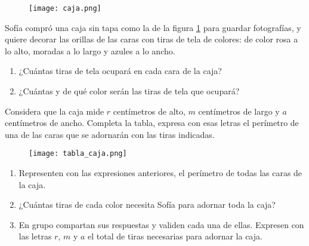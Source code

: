 \begin{enumerate}
    \begin{minipage}[t]{.2\textwidth}
        \begin{figure}[H]
            \centering
            \texttt{[image: caja.png]}
            \label{fig:caja}
        \end{figure}
    \end{minipage}\hfill
    \begin{minipage}[t]{.7\textwidth}
        \item Sofía compró una caja sin tapa como la de la figura \ref{fig:caja} para guardar fotografías,
        y quiere decorar las orillas de las caras con tiras de tela de colores: de color rosa
        a lo alto, moradas a lo largo y azules a lo ancho.

        \begin{enumerate}
            \item ¿Cuántas tiras de tela ocupará en cada cara de la caja?
            \item ¿Cuántas y de qué color serán las tiras de tela que ocupará?
        \end{enumerate}
    \end{minipage}

    \item Considera que la caja mide $r$ centímetros de alto, $m$ centímetros de largo
          y $a$ centímetros de ancho. Completa la tabla, expresa con esas letras el perímetro
          de una de las caras que se adornarán con las tiras indicadas.
          \begin{figure}[H]
              \centering
              \texttt{[image: tabla\_caja.png]}
              \label{fig:tabla_caja}
          \end{figure}
          \begin{enumerate}
              \item Representen con las expresiones anteriores, el perímetro de todas las caras de la
                    caja.
              \item ¿Cuántas tiras de cada color necesita Sofía para adornar toda la caja?
              \item En grupo compartan sus respuestas y validen cada una de ellas. Expresen con
                    las letras $r$, $m$ y $a$ el total de tiras necesarias para adornar la caja.
          \end{enumerate}


\end{enumerate}
